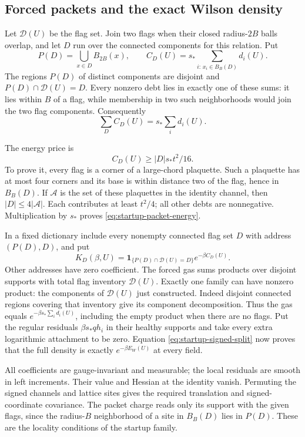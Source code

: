 \subsection{Forced packets and the exact Wilson density}
Let $\mathcal D(U)$ be the flag set. Join two flags when their closed
radius-$2B$ balls overlap, and let $D$ run over the connected
components for this relation. Put
\[
 P(D)=\bigcup_{x\in D}B_{2B}(x),\qquad
 C_D(U)=s_*\sum_{i:\,x_i\in B_B(D)}d_i(U).
\]
The regions $P(D)$ of distinct components are disjoint and
$P(D)\cap\mathcal D(U)=D$. Every nonzero debt lies in exactly one
of these sums: it lies within $B$ of a flag, while membership in
two such neighborhoods would join the two flag components.
Consequently
\[
                 \sum_D C_D(U)=s_*\sum_i d_i(U).
\]

The energy price is
\begin{equation}\label{eq:startup-packet-energy}
                    C_D(U)\ge |D|s_*t^2/16.
\end{equation}
To prove it, every flag is a corner of a large-chord plaquette.
Such a plaquette has at most four corners and its base is within
distance two of the flag, hence in $B_B(D)$. If $\mathcal A$ is
the set of these plaquettes in the identity channel, then
$|D|\le4|\mathcal A|$. Each contributes at least $t^2/4$;
all other debts are nonnegative. Multiplication by $s_*$ proves
\eqref{eq:startup-packet-energy}.

In a fixed dictionary include every nonempty connected flag set $D$
with address $(P(D),D)$, and put
\[
 K_D(\beta,U)=
 \mathbf1_{\{P(D)\cap\mathcal D(U)=D\}}e^{-\beta C_D(U)}.
\]
Other addresses have zero coefficient. The forced gas sums products
over disjoint supports with total flag inventory $\mathcal D(U)$.
Exactly one family can have nonzero product: the components of
$\mathcal D(U)$ just constructed. Indeed disjoint connected regions
covering that inventory give its component decomposition. Thus the
gas equals $e^{-\beta s_*\sum_i d_i(U)}$, including the empty
product when there are no flags. Put the regular residuals
$\beta s_*q h_i$ in their healthy supports and take every extra
logarithmic attachment to be zero. Equation
\eqref{eq:startup-signed-split} now proves that the full density is
exactly $e^{-\beta E_W(U)}$ at every field.

All coefficients are gauge-invariant and measurable; the local
residuals are smooth in left increments. Their value and Hessian
at the identity vanish. Permuting the signed channels and lattice
sites gives the required translation and signed-coordinate
covariance. The packet charge reads only its support with the given
flags, since the radius-$B$ neighborhood of a site in $B_B(D)$
lies in $P(D)$. These are the locality conditions of the startup
family.


